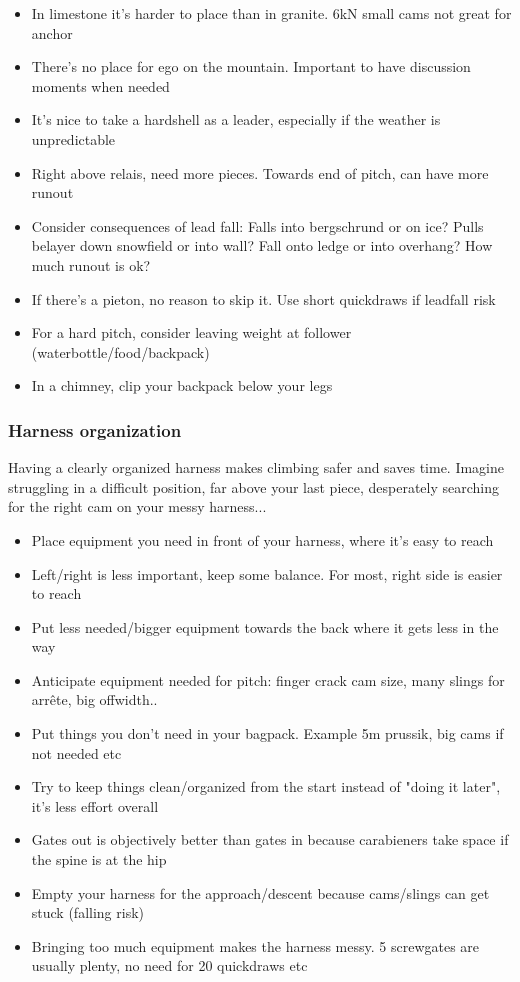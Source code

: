 \begin{itemize}
\item In limestone it's harder to place than in granite. 6kN small cams not great for anchor
\item There's no place for ego on the mountain. Important to have discussion moments when needed
\item It's nice to take a hardshell as a leader, especially if the weather is unpredictable
\item Right above relais, need more pieces. Towards end of pitch, can have more runout
\item Consider consequences of lead fall: Falls into bergschrund or on ice? Pulls belayer down snowfield or into wall? Fall onto ledge or into overhang? How much runout is ok?
\item If there's a pieton, no reason to skip it. Use short quickdraws if leadfall risk
\item For a hard pitch, consider leaving weight at follower (waterbottle/food/backpack)
\item In a chimney, clip your backpack below your legs
\end{itemize}

\subsubsection{Harness organization}
Having a clearly organized harness makes climbing safer and saves time.
Imagine struggling in a difficult position, far above your last piece, desperately searching for the right cam on your messy harness...
\begin{itemize}
\item Place equipment you need in front of your harness, where it's easy to reach
\item Left/right is less important, keep some balance. For most, right side is easier to reach
\item Put less needed/bigger equipment towards the back where it gets less in the way
\item Anticipate equipment needed for pitch: finger crack cam size, many slings for arrête, big offwidth..
\item Put things you don't need in your bagpack. Example 5m prussik, big cams if not needed etc
\item Try to keep things clean/organized from the start instead of "doing it later", it's less effort overall
\item Gates out is objectively better than gates in because carabieners take space if the spine is at the hip
\item Empty your harness for the approach/descent because cams/slings can get stuck (falling risk)
\item Bringing too much equipment makes the harness messy. 5 screwgates are usually plenty, no need for 20 quickdraws etc
\end{itemize}


